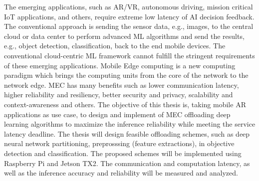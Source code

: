 \hypertarget{inroduction}{%
\label{sec:introduction}}
\thispagestyle{fancy}

The emerging applications, such as AR/VR, autonomous driving, mission critical IoT applications, and others, require extreme low latency of AI decision feedback. The conventional approach is sending the sensor data, e.g., images,
to the central cloud or data center to perform advanced ML algorithms and send the results, e.g., object detection, classification, back to the end mobile devices. The conventional cloud-centric ML framework cannot fulfill the stringent requirements of these emerging applications. Mobile Edge computing is a new computing paradigm which brings the computing units from the core of
the network to the network edge. MEC has many benefits such as lower communication latency, higher reliability and resiliency, better security and privacy, scalability and context-awareness and others. The objective of this thesis is, taking mobile AR applications as use case, to design and implement of MEC offloading deep learning algorithms to maximize the inference reliability while meeting the service latency deadline. The thesis will design feasible offloading schemes, such as deep neural network partitioning, preprosssing (feature extractions), in objective detection and classification. The proposed schemes will be implemented using Raspberry Pi and Jetson TX2. The communication and computation latency, as well as the inference accuracy and reliability will be measured and analyzed.

